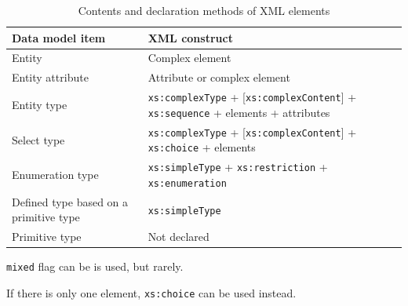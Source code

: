 \begin{table}[h]\footnotesize
    \centering
    \caption{Contents and declaration methods of XML elements}
    \label{tab:xml-elements}
    
    \begin{threeparttable}
        \begin{tabu} to 
            \hline
                Data model item  &   XML construct         \\
            \hline
                Entity            &   Complex element
                      \\
                Entity attribute            &   Attribute or complex element
                      \\
                Entity type            &   
                    \texttt{xs:complexType} + [\texttt{xs:complexContent}] \newline
                    + \texttt{xs:sequence} + elements + attributes  \\
                Select type            &   
                    \texttt{xs:complexType} + [\texttt{xs:complexContent}] \newline
                    + \texttt{xs:choice} + elements  \\
                Enumeration type &   
                    \texttt{xs:simpleType}  +  \texttt{xs:restriction} + \texttt{xs:enumeration} \\
                Defined type \newline based on \newline a primitive type &   
                    \texttt{xs:simpleType}  \\
                Primitive type &
                    Not declared \\
            \hline
        \end{tabu}
        \begin{tablenotes}
          \item\label{tnote:mixed-flag} \texttt{mixed} flag can be is used, but rarely.
          \item\label{tnote:choice-instead-sequence} If there is only one element, \texttt{xs:choice} can be used instead.
        \end{tablenotes}
    \end{threeparttable}
\end{table}





